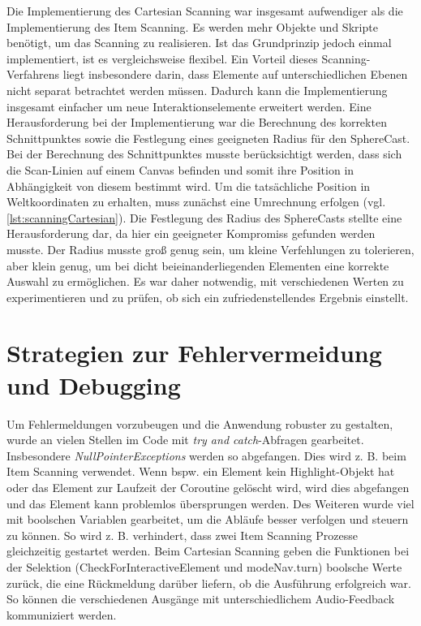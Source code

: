 Die Implementierung des Cartesian Scanning war insgesamt aufwendiger als die Implementierung des Item Scanning. Es werden mehr Objekte und Skripte benötigt, um das Scanning zu realisieren. Ist das Grundprinzip jedoch einmal implementiert, ist es vergleichsweise flexibel. Ein Vorteil dieses Scanning-Verfahrens liegt insbesondere darin, dass Elemente auf unterschiedlichen Ebenen nicht separat betrachtet werden müssen. Dadurch kann die Implementierung insgesamt einfacher um neue Interaktionselemente erweitert werden. 
Eine Herausforderung bei der Implementierung war die Berechnung des korrekten Schnittpunktes sowie die Festlegung eines geeigneten Radius für den SphereCast. Bei der Berechnung des Schnittpunktes musste berücksichtigt werden, dass sich die Scan-Linien auf einem Canvas befinden und somit ihre Position in Abhängigkeit von diesem bestimmt wird. Um die tatsächliche Position in Weltkoordinaten zu erhalten, muss zunächst eine Umrechnung erfolgen (vgl.\autoref{lst:scanningCartesian}). Die Festlegung des Radius des SphereCasts stellte eine Herausforderung dar, da hier ein geeigneter Kompromiss gefunden werden musste. Der Radius musste groß genug sein, um kleine Verfehlungen zu tolerieren, aber klein genug, um bei dicht beieinanderliegenden Elementen eine korrekte Auswahl zu ermöglichen. Es war daher notwendig, mit verschiedenen Werten zu experimentieren und zu prüfen, ob sich ein zufriedenstellendes Ergebnis einstellt.

\section{Strategien zur Fehlervermeidung und Debugging}

Um Fehlermeldungen vorzubeugen und die Anwendung robuster zu gestalten, wurde an vielen Stellen im Code mit \textit{try and catch}-Abfragen gearbeitet. Insbesondere \textit{NullPointerExceptions} werden so abgefangen. Dies wird z. B. beim Item Scanning verwendet. Wenn bspw. ein Element kein Highlight-Objekt hat oder das Element zur Laufzeit der Coroutine gelöscht wird, wird dies abgefangen und das Element kann problemlos übersprungen werden. Des Weiteren wurde viel mit boolschen Variablen gearbeitet, um die Abläufe besser verfolgen und steuern zu können. So wird z. B. verhindert, dass zwei Item Scanning Prozesse gleichzeitig gestartet werden. Beim Cartesian Scanning geben die Funktionen bei der Selektion (CheckForInteractiveElement und modeNav.turn) boolsche Werte zurück, die eine Rückmeldung darüber liefern, ob die Ausführung erfolgreich war. So können die verschiedenen Ausgänge mit unterschiedlichem Audio-Feedback kommuniziert werden. 

